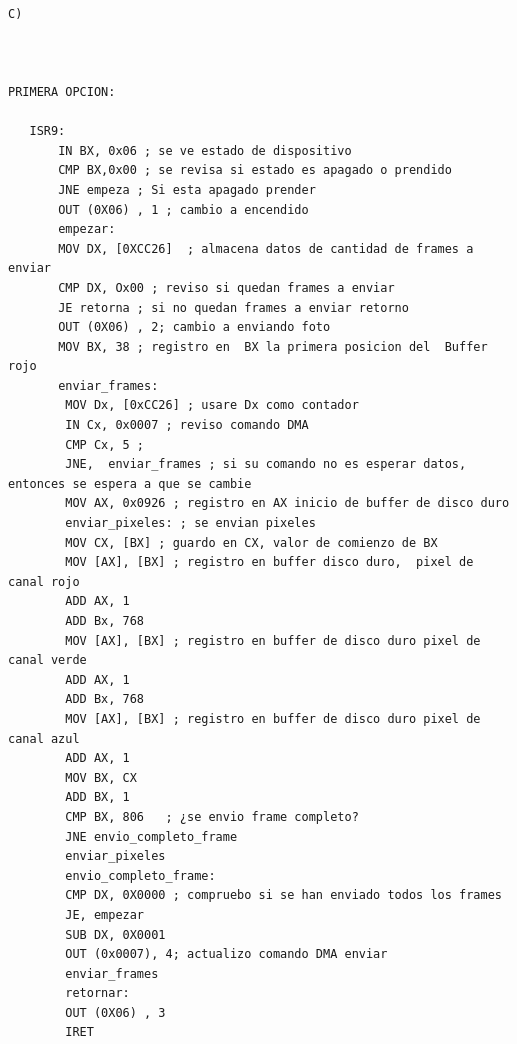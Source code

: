 \documentclass{article}
\begin{document}
    \begin{lstlisting} 
    
C)



PRIMERA OPCION:

   ISR9:
       IN BX, 0x06 ; se ve estado de dispositivo
       CMP BX,0x00 ; se revisa si estado es apagado o prendido
       JNE empeza ; Si esta apagado prender
       OUT (0X06) , 1 ; cambio a encendido
       empezar:
       MOV DX, [0XCC26]  ; almacena datos de cantidad de frames a enviar
       CMP DX, Ox00 ; reviso si quedan frames a enviar
       JE retorna ; si no quedan frames a enviar retorno
       OUT (0X06) , 2; cambio a enviando foto
       MOV BX, 38 ; registro en  BX la primera posicion del  Buffer rojo
       enviar_frames:
        MOV Dx, [0xCC26] ; usare Dx como contador
        IN Cx, 0x0007 ; reviso comando DMA
        CMP Cx, 5 ; 
        JNE,  enviar_frames ; si su comando no es esperar datos, entonces se espera a que se cambie
        MOV AX, 0x0926 ; registro en AX inicio de buffer de disco duro
        enviar_pixeles: ; se envian pixeles
        MOV CX, [BX] ; guardo en CX, valor de comienzo de BX
        MOV [AX], [BX] ; registro en buffer disco duro,  pixel de canal rojo
        ADD AX, 1
        ADD Bx, 768
        MOV [AX], [BX] ; registro en buffer de disco duro pixel de canal verde
        ADD AX, 1
        ADD Bx, 768
        MOV [AX], [BX] ; registro en buffer de disco duro pixel de canal azul
        ADD AX, 1
        MOV BX, CX
        ADD BX, 1
        CMP BX, 806   ; ¿se envio frame completo?
        JNE envio_completo_frame
        enviar_pixeles
        envio_completo_frame:
        CMP DX, 0X0000 ; compruebo si se han enviado todos los frames
        JE, empezar
        SUB DX, 0X0001
        OUT (0x0007), 4; actualizo comando DMA enviar 
        enviar_frames
        retornar:
        OUT (0X06) , 3
        IRET
    \end{lstlisting}
       
       
       
\end{document}
